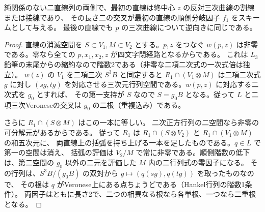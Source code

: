 \begin{corollary}\label{cor:two-line-secant-roots}
純関係のない二直線列の両側で、最初の直線は終中心 $z$ の反対三次曲線の割線または接線であり、
その長さ二の交叉が最初の直線の順側分岐因子 $f_1$ をスキームとして与える。
最後の直線でも $p$ の三次曲線について逆向きに同じである。
\end{corollary}
\begin{proof}
直線の消滅空間を $S\subset V_1,M\subset V_2$ とする。$p,z$ をつなぐ
$w(p,z)$ は非零である。零なら全ての $p,x_1,x_2,z$ が四文字閉経路となるからである。
これは $L_3$ 鉛筆の末尾からの縮約なので階数2である（非零な二項二次式の一次式倍は独立）。
$w(z)$ の $V_1$ を二項三次 $S^3 B$ と同定すると
$R_1\cap(V_1\otimes M)$ は二項二次式 $g$ に対し
$(s g,t g)$ を対応させる三次元行列空間である。$w(p,z)$ に対応する二次式を $g_0$ とすれば、
その第一支持が $S$ なので $S=g_0 B$ となる。従って $L$ と二項三次Veroneseの交叉は
$g_0$ の二根（重複込み）である。

さらに $R_1\cap(S\otimes M)$ はこの一本に等しい。
二次正方行列の二空間なら非零の可分解元があるからである。
従って $R_1$ は $R_1\cap(S\otimes V_2)$ と $R_1\cap(V_1\otimes M)$ の和五次元に、
両直線上の括弧を持ち上げる一本を足したものである。$q\in L$ で第一の空間は消え、
括弧の評価は $V_2/M$ で常に非零である。順側階数の低下は、第二空間の
$g_0$ 以外の二元を評価した $M$ 内の二行列式の零因子になる。
その行列は、$S^3B/(g_0 B)$ の双対から $g\mapsto (q(sg),q(tg))$ を取ったものなので、
その根は $q$ がVeronese上にある点ちょうどである（Hankel行列の階数1条件）。
両因子はともに長さ2で、二つの相異なる根なら各単根、一つなら二重根となる。
\end{proof}
